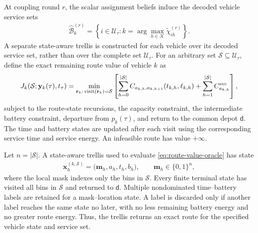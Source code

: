 At coupling round $r$, the scalar assignment beliefs induce the decoded vehicle service sets
\begin{align}
    \widehat{\mathcal B}_k^{(r)}
    =\left\{i\in\mathcal U_\tau:
    k=\arg\max_{h\in\mathcal K}\widetilde\chi_{ih}^{(r)}\right\}.
    \label{eq:decoded-service-set-revised}
\end{align}
A separate state-aware trellis is constructed for each vehicle over its decoded service set, rather than over the complete set $\mathcal U_\tau$. For an arbitrary set $\mathcal S\subseteq\mathcal U_\tau$, define the exact remaining route value of vehicle $k$ as
\begin{align}
 J_k(\mathcal S;\mathbf y_k(\tau),t_\tau)
 =\min_{\mathbf r_k:\,\mathrm{visit}(\mathbf r_k)=\mathcal S}
 \left[\sum_{h=0}^{|\mathcal S|}
 C_{a_{k,h},a_{k,h+1}}(t_{k,h},\ell_{k,h})
 +\sum_{h=1}^{|\mathcal S|}C_{a_{k,h}}^{\rm svc}\right],
 \label{eq:route-value-oracle}
\end{align}
subject to the route-state recursions, the capacity constraint, the intermediate battery constraint, departure from $p_k(\tau)$, and return to the common depot $\mathsf d$. The time and battery states are updated after each visit using the corresponding service time and service energy. An infeasible route has value $+\infty$.

Let $n=|\mathcal S|$. A state-aware trellis used to evaluate \eqref{eq:route-value-oracle} has state
\begin{align}
 \mathbf x_h^{(k,\mathcal S)}
 =\bigl(\mathbf m_h,a_h,t_h,b_h\bigr),
 \qquad \mathbf m_h\in\{0,1\}^{n},
 \label{eq:local-trellis-state}
\end{align}
where the local mask indexes only the bins in $\mathcal S$. Every finite terminal state has visited all bins in $\mathcal S$ and returned to $\mathsf d$. Multiple nondominated time--battery labels are retained for a mask--location state. A label is discarded only if another label reaches the same state no later, with no less remaining battery energy and no greater route energy. Thus, the trellis returns an exact route for the specified vehicle state and service set.

